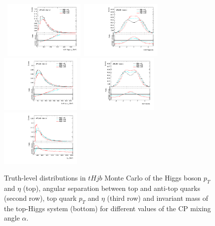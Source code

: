 \begin{figure}[!ht] 
  \begin{center}
    \mbox{ 
      \includegraphics[width=0.35\textwidth]{figures/tthcp_chapter/observables/tHjb/c_H_pt.pdf}
      \includegraphics[width=0.35\textwidth]{figures/tthcp_chapter/observables/tHjb/c_H_eta.pdf}
    }
    \mbox{ 
      \includegraphics[width=0.35\textwidth]{figures/tthcp_chapter/observables/tHjb/c_t_pt.pdf}
      \includegraphics[width=0.35\textwidth]{figures/tthcp_chapter/observables/tHjb/c_t_eta.pdf}
    }
    \mbox{ 
      \includegraphics[width=0.35\textwidth]{figures/tthcp_chapter/observables/tHjb/c_tH_m.pdf}
    }
  \end{center}
  \caption{Truth-level distributions in $tHjb$ Monte Carlo of the Higgs boson $p_{T}$ and $\eta$ (top), angular separation between top and anti-top quarks (second row), top quark $p_{T}$ and $\eta$ (third row) and invariant mass of the top-Higgs system (bottom) for different values of the CP mixing angle $\alpha$.}
  \label{fig:tHjb_truth}
\end{figure}
\clearpage

